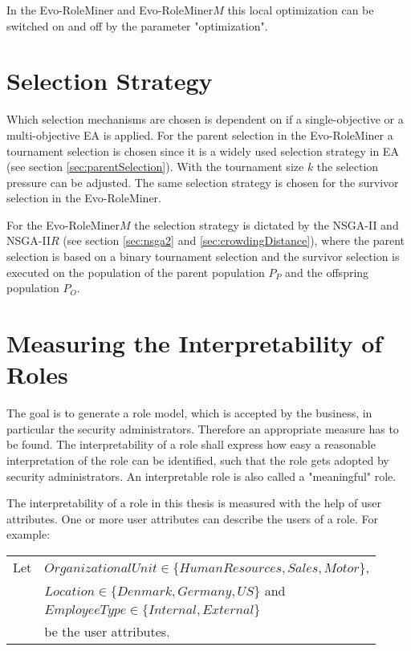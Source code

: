         In the Evo-RoleMiner and Evo-RoleMiner$M$ this local optimization can be switched on and off by the parameter "optimization".
        
    \section{Selection Strategy}
    Which selection mechanisms are chosen is dependent on if a single-objective or a multi-objective EA is applied. 
    For the parent selection in the Evo-RoleMiner a tournament selection is chosen since it is a widely used selection strategy in EA (see section \ref{sec:parentSelection}). With the tournament size $k$ the selection pressure can be adjusted. The same selection strategy is chosen for the survivor selection in the Evo-RoleMiner.
    
    For the Evo-RoleMiner$M$ the selection strategy is dictated by the NSGA-II and NSGA-II$R$ (see section \ref{sec:nsga2} and \ref{sec:crowdingDistance}), where the parent selection is based on a binary tournament selection and the survivor selection is executed on the population of the parent population $P_P$ and the offspring population $P_O$.
    
    \section{Measuring the Interpretability of Roles}
    \label{sec:meaningfulness}
    The goal is to generate a role model, which is accepted by the business, in particular the security administrators. Therefore an appropriate measure has to be found. The interpretability of a role shall express how easy a reasonable interpretation of the role can be identified, such that the role gets adopted by security administrators. An interpretable role is also called a "meaningful" role.
    
    The interpretability of a role in this thesis is measured with the help of user attributes. One or more user attributes can describe the users of a role. For example:
    
    \begin{listliketab}
        \begin{tabular}{ll}
            Let     &  $OrganizationalUnit \in \{HumanResources, Sales, Motor\}$,\\
                    &  $Location \in \{Denmark, Germany, US\}$ and\\
                    &  $EmployeeType \in \{Internal, External\}$\\
                    &  be the user attributes.  
        \end{tabular}
    \end{listliketab}
    
